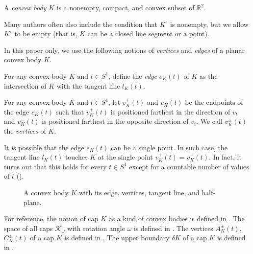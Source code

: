 \begin{definition}

A \emph{convex body} \(K\) is a nonempty, compact, and convex subset of \(\mathbb{R}^2\).

\label{def:convex-body}
\end{definition}

Many authors often also include the condition that \(K^\circ\) is nonempty, but we allow \(K^\circ\) to be empty (that is, \(K\) can be a closed line segment or a point).

In this paper only, we use the following notions of \emph{vertices} and \emph{edges} of a planar convex body \(K\).

\begin{definition}

For any convex body \(K\) and \(t \in S^1\), define the \emph{edge} \(e_K(t)\) of \(K\) as the intersection of \(K\) with the tangent line \(l_K(t)\).

\label{def:convex-body-edge}
\end{definition}

\begin{definition}

For any convex body \(K\) and \(t \in S^1\), let \(v_K^+(t)\) and \(v_K^-(t)\) be the endpoints of the edge \(e_K(t)\) such that \(v_K^+(t)\) is positioned farthest in the direction of \(v_t\) and \(v_K^-(t)\) is positioned farthest in the opposite direction of \(v_t\). We call \(v_K^{\pm}(t)\) the \emph{vertices} of \(K\).

\label{def:convex-body-vertex}
\end{definition}

It is possible that the edge \(e_K(t)\) can be a single point. In such case, the tangent line \(l_K(t)\) touches \(K\) at the single point \(v_K^+(t) = v_K^-(t)\). In fact, it turns out that this holds for every \(t \in S^1\) except for a countable number of values of \(t\) ().

\begin{figure}
\centering

\caption{A convex body \(K\) with its edge, vertices, tangent line, and half-plane.}
\label{fig:convex-body}
\end{figure}

For reference, the notion of cap \(K\) as a kind of convex bodies is defined in . The space of all caps \(\mathcal{K}_\omega\) with rotation angle \(\omega\) is defined in . The vertices \(A_K^{\pm}(t)\), \(C_K^{\pm}(t)\) of a cap \(K\) is defined in . The upper boundary \(\delta K\) of a cap \(K\) is defined in .